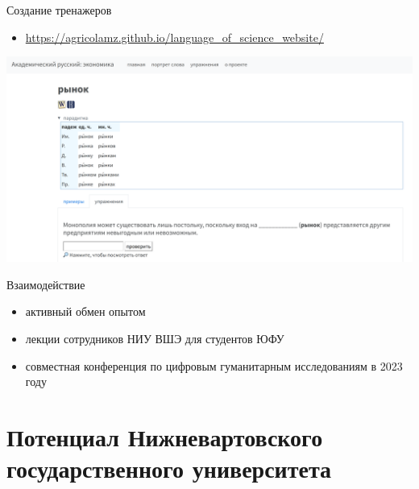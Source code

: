 \documentclass[
  ignorenonframetext,
]{beamer}
\providecommand{\tightlist}{%
  \setlength{\itemsep}{0pt}\setlength{\parskip}{0pt}}
\begin{document}
\begin{frame}{Создание тренажеров}
\protect\hypertarget{ux441ux43eux437ux434ux430ux43dux438ux435-ux442ux440ux435ux43dux430ux436ux435ux440ux43eux432}{}
\begin{itemize}
\tightlist
\item
  \url{https://agricolamz.github.io/language_of_science_website/}
\end{itemize}

\begin{center}\includegraphics[width=0.98\linewidth]{images/economy} \end{center}
\end{frame}

\begin{frame}{Взаимодействие}
\protect\hypertarget{ux432ux437ux430ux438ux43cux43eux434ux435ux439ux441ux442ux432ux438ux435}{}
\begin{itemize}
\tightlist
\item
  активный обмен опытом
\item
  лекции сотрудников НИУ ВШЭ для студентов ЮФУ
\item
  совместная конференция по цифровым гуманитарным исследованиям в 2023
  году
\end{itemize}
\end{frame}

\hypertarget{ux43fux43eux442ux435ux43dux446ux438ux430ux43b-ux43dux438ux436ux43dux435ux432ux430ux440ux442ux43eux432ux441ux43aux43eux433ux43e-ux433ux43eux441ux443ux434ux430ux440ux441ux442ux432ux435ux43dux43dux43eux433ux43e-ux443ux43dux438ux432ux435ux440ux441ux438ux442ux435ux442ux430}{%
\section{Потенциал Нижневартовского государственного
университета}\label{ux43fux43eux442ux435ux43dux446ux438ux430ux43b-ux43dux438ux436ux43dux435ux432ux430ux440ux442ux43eux432ux441ux43aux43eux433ux43e-ux433ux43eux441ux443ux434ux430ux440ux441ux442ux432ux435ux43dux43dux43eux433ux43e-ux443ux43dux438ux432ux435ux440ux441ux438ux442ux435ux442ux430}}
\end{document}
